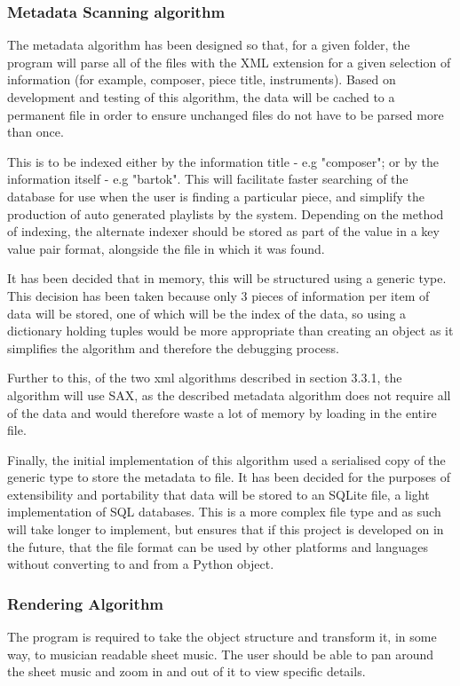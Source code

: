\subsubsection{Metadata Scanning algorithm}
The metadata algorithm has been designed so that, for a given folder, the program will parse all of the files with the XML extension for a given selection of information (for example, composer, piece title, instruments). Based on development and testing of this algorithm, the data will be cached to a permanent file in order to ensure unchanged files do not have to be parsed more than once.

This is to be indexed either by the information title - e.g "composer"; or by the information itself - e.g "bartok". This will facilitate faster searching of the database for use when the user is finding a particular piece, and simplify the production of auto generated playlists by the system. Depending on the method of indexing, the alternate indexer should be stored as part of the value in a key value pair format, alongside the file in which it was found.

It has been decided that in memory, this will be structured using a generic type. This decision has been taken because only 3 pieces of information per item of data will be stored, one of which will be the index of the data, so using a dictionary holding tuples would be more appropriate than creating an object as it simplifies the algorithm and therefore the debugging process.

Further to this, of the two xml algorithms described in section 3.3.1, the algorithm will use SAX, as the described metadata algorithm does not require all of the data and would therefore waste a lot of memory by loading in the entire file.

Finally, the initial implementation of this algorithm used a serialised copy of the generic type to store the metadata to file. It has been decided for the purposes of extensibility and portability that data will be stored to an SQLite file, a light implementation of SQL databases. This is a more complex file type and as such will take longer to implement, but ensures that if this project is developed on in the future, that the file format can be used by other platforms and languages without converting to and from a Python object.

\subsubsection{Rendering Algorithm}
The program is required to take the object structure and transform it, in some way, to musician readable sheet music. The user should be able to pan around the sheet music and zoom in and out of it to view specific details.

